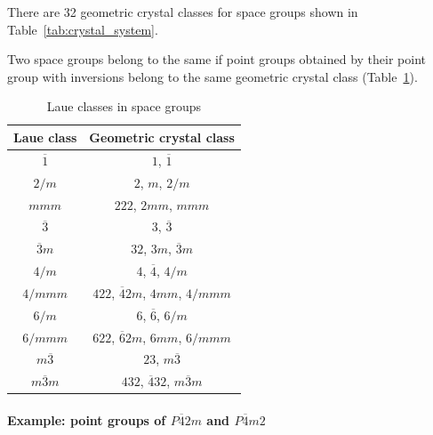 There are 32 geometric crystal classes for space groups shown in Table~\ref{tab:crystal_system}.

Two space groups belong to the same  if point groups obtained by their point group with inversions belong to the same geometric crystal class (Table~\ref{tab:laue_class}).

\begin{table}[htb]
  \centering
  \caption{Laue classes in space groups}
  \label{tab:laue_class}
  \begin{tabular}[h]{cc}
    \hline\hline
    Laue class       & Geometric crystal class \\ \hline
    $\overline{1}$   & $1$, $\overline{1}$ \\
    $2/m$            & $2$, $m$, $2/m$ \\
    $mmm$            & $222$, $2mm$, $mmm$ \\
    $\overline{3}$   & $3$, $\overline{3}$ \\
    $\overline{3}m$  & $32$, $3m$, $\overline{3}m$ \\
    $4/m$            & $4$, $\overline{4}$, $4/m$ \\
    $4/mmm$          & $422$, $\overline{4}2m$, $4mm$, $4/mmm$ \\
    $6/m$            & $6$, $\overline{6}$, $6/m$ \\
    $6/mmm$          & $622$, $\overline{6}2m$, $6mm$, $6/mmm$ \\
    $m\overline{3}$  & $23$, $m\overline{3}$ \\
    $m\overline{3}m$ & $432$, $\overline{4}32$, $m\overline{3}m$ \\
    \hline\hline
  \end{tabular}
\end{table}

\paragraph{Example: point groups of $P\overline{4}2m$ and $P\overline{4}m2$}


